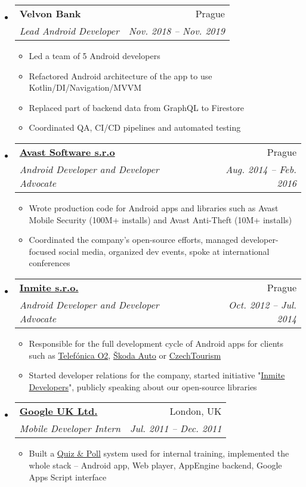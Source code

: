 \documentclass[letterpaper,11pt]{article}
\makeatletter
\newcommand{\resitem}[1]{\item #1 \vspace{-2pt}}
\newcommand{\ressubheading}[4]{
\begin{tabular*}{6.5in}{l@{\extracolsep{\fill}}r}
		\textbf{#1} & #2 \\
		\textit{#3} & \textit{#4} \\
\end{tabular*}\vspace{-6pt}}
\makeatother
\begin{document}
\begin{itemize}
	\item 
			\ressubheading{Velvon Bank}{Prague}{Lead Android Developer}{Nov. 2018 -- Nov. 2019}
				{ \footnotesize
				\begin{itemize}
					\resitem{Led a team of 5 Android developers}
					\resitem{Refactored Android architecture of the app to use Kotlin/DI/Navigation/MVVM}
					\resitem{Replaced part of backend data from GraphQL to Firestore}
					\resitem{Coordinated QA, CI/CD pipelines and automated testing}
					
				\end{itemize}
				}					
				
	    \item 
			\ressubheading{\href{http://www.avast.com}{Avast Software s.r.o}}{Prague}{Android Developer and Developer Advocate}{Aug. 2014 -- Feb. 2016}
				{ \footnotesize
				\begin{itemize}
					\resitem{Wrote production code for Android apps and libraries such as Avast Mobile Security (100M+ installs) and Avast Anti-Theft (10M+ installs)}
					\resitem {Coordinated the company’s open-source efforts, managed developer-focused social media, organized dev events, spoke at international conferences}
				\end{itemize}
				}	
	    \item 
			\ressubheading{\href{http://www.inmite.eu}{Inmite s.r.o.}}{Prague}{Android Developer and Developer Advocate}{Oct. 2012 -- Jul. 2014}
				{ \footnotesize
				\begin{itemize}
					\resitem{Responsible for the full development cycle of Android apps for clients such as \href{https://play.google.com/store/apps/details?id=cz.o2.moje}{Telefónica O2}, \href{https://play.google.com/store/apps/details?id=eu.inmite.prj.skoda.service}{Škoda Auto} or \href{https://play.google.com/store/apps/details?id=com.czechtourism.top100.android}{CzechTourism}}
					\resitem {Started developer relations for the company, started initiative "\href{inmite.github.io}{Inmite Developers}", publicly speaking about our open-source libraries}
				\end{itemize}
				}
	    \item 
			\ressubheading{\href{http://www.google.com}{Google UK Ltd.}}{London, UK}{Mobile Developer Intern}{Jul. 2011 -- Dec. 2011}
				{ \footnotesize
				\begin{itemize}
					\resitem{Built a \href{http://code.google.com/p/quiz-and-poll/}{Quiz \& Poll} system used for internal training, implemented the whole stack – Android app, Web player, AppEngine backend, Google Apps Script interface}

\end{itemize}}
\end{itemize}
\end{document}
